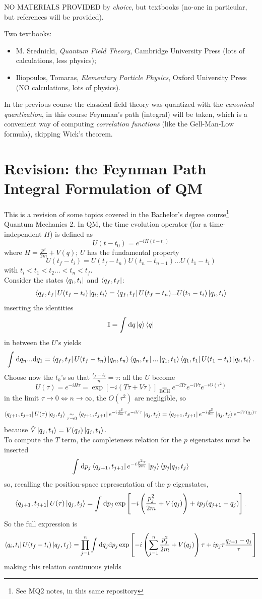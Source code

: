 
NO MATERIALS PROVIDED by \textit{choice}, but textbooks (no-one in particular,
but references will be provided).

Two textbooks:
\begin{itemize}
    \item M. Srednicki, \textit{Quantum Field Theory}, Cambridge University Press
        (lots of calculations, less physics);
    \item Iliopoulos, Tomaras, \textit{Elementary Particle Physics}, Oxford
        University Press (NO calculations, lots of physics).
\end{itemize}
In the previous course the classical field theory was quantized with the \textit{
canonical quantization}, in this course Feynman's path (integral) will be taken,
which is a convenient way of computing \textit{correlation functions} (like the
Gell-Man-Low formula), skipping Wick's theorem.
\section{Revision: the Feynman Path Integral Formulation of QM}
This is a revision of some topics covered in the Bachelor's degree course\footnote
{See MQ2 notes, in this same repository} Quantum Mechanics 2.
In QM, the time evolution operator (for a time-independent $H$) is defined as
$$U(t-t_0) = e^{-iH(t-t_0)}$$
where $H=\frac{p^2}{2m}+V(q)$; $U$ has the fundamental property
$$U(t_f-t_i) = U(t_f-t_n)U(t_n-t_{n-1})...U(t_1-t_i)$$
with $t_i<t_1<t_2...<t_n<t_f$.\\
Consider the states $\bra{q_i,t_i}$ and $\bra{q_f,t_f}$:
$$\bra{q_f,t_f} U(t_f-t_i)\ket{q_i,t_i} = \bra{q_f,t_f}U(t_f-t_n)...U(t_1-t_i)
\ket{q_i,t_i}$$
inserting the identities
$$\mathbb{I} = \int_{}^{} \dd q\ket{q}\bra{q}$$
in between the $U$'s yields
$$\int_{}^{} \dd q_n...\dd q_1 = \bra{q_f,t_f}U(t_f-t_n)\ket{q_n,t_n}
\bra{q_n,t_n}...\ket{q_1,t_1}\bra{q_1,t_1}U(t_1-t_i)\ket{q_i,t_i}.$$
Choose now the $t_k$'s so that $\frac{t_f-t_i}{n}=\tau$: all the $U$ become
$$U(\tau)=e^{-iH\tau} = \exp\left[-i(T\tau+V\tau)\right] \underset{\text{BCH}}=
e^{-iT\tau}e^{-iV\tau}e^{-i O(\tau^2)}$$
in the limit $\tau\to 0 \iff n\to\infty$, the $O(\tau^2)$ are negligible, so
$$\bra{q_{j+1},t_{j+1}}U(\tau)\ket{q_j,t_j}\underset{\tau\to0}\sim
\bra{q_{j+1},t_{j+1}}e^{-i\frac{p^2}{2m}\tau}e^{-iV\tau}\ket{q_j,t_j}=
\bra{q_{j+1},t_{j+1}}e^{-i\frac{p^2}{2m}}\ket{q_j,t_j}e^{-iV(q_j)\tau}
$$
because $\hat V\ket{q_j,t_j} = V(q_j)\ket{q_j,t_j}$.\\
To compute the $T$ term, the completeness relation for the $p$ eigenstates
must be inserted
$$\int_{}^{} \dd p_j \bra{q_{j+1},t_{j+1}}e^{-i\frac{p^2\tau}{2m}}\ket{p_j}
\bra{p_j}\ket{q_j,t_j}$$
so, recalling the position-space representation of the $p$ eigenstates,
$$\bra{q_{j+1},t_{j+1}}U(\tau)\ket{q_{j},t_j} = 
\int_{}^{} \dd p_j \exp\left[-i\left(\frac{p_j^2}{2m}+V(q_j)\right)+
ip_j(q_{j+1}-q_j)\right].$$
So the full expression is
$$\bra{q_i,t_i}U(t_f-t_i)\ket{q_f,t_f} =
\prod_{j=1}^{n}\int_{}^{} \dd q_j\dd p_j \exp\left[-i\left(\sum_{j=1}^{n}
\frac{p_j^2}{2m}+V(q_j)\right)\tau + ip_j\tau\frac{q_{j+1}-q_j}{\tau}\right]
$$
making this relation continuous yields

